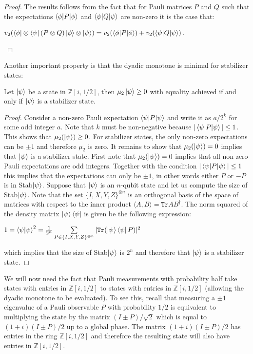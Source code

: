 \documentclass[12pt]{dalthesis}
\begin{document}
\begin{proof}
The results follows from the fact that for Pauli matrices $P$ and $Q$ such that the expectations $\braket{\phi | P |\phi}$ and $\braket{\psi | Q | \psi}$ are non-zero it is the case that:
\begin{center}
$v_2 (\bra{\phi} \otimes \bra{\psi} (P \otimes Q) \ket{\phi} \otimes \ket{\psi}) = v_2 (\braket{\phi | P | \phi}) + v_2(\braket{\psi | Q | \psi})$.
\end{center}
\end{proof}

Another important property is that the dyadic monotone is minimal for stabilizer states:
\begin{proposition}
Let $\ket{\psi}$ be a state in $\mathbb{Z}[i, 1/2]$, then $\mu_2 \ket{\psi} \geq 0$ with equality achieved if and only if $\ket{\psi}$ is a stabilizer state.
\end{proposition}
\begin{proof}
Consider a non-zero Pauli expectation $\braket{\psi |P| \psi}$ and write it as $a/2^k$ for some odd integer $a$. Note that $k$ must be non-negative because $|\braket{\psi |P| \psi}| \leq 1$. This shows that $\mu_2 (\ket{\psi}) \geq 0$. For stabilizer states, the only non-zero expectations can be $\pm 1$ and therefore $\mu_2$ is zero. It remains to show that $\mu_2 (\ket{\psi}) = 0$ implies that $\ket{\psi}$ is a stabilizer state. First note that $\mu_2 (\ket{\psi}) = 0$ implies that all non-zero Pauli expectations are odd integers. Together with the condition $|\braket{\psi |P| \psi}| \leq 1$ this implies that the expectations can only be $\pm 1$, in other words either $P$ or $-P$ is in Stab$\ket{\psi}$. Suppose that $\ket{\psi}$ is an $n$-qubit state and let us compute the size of Stab$\ket{\psi}$. Note that the set $\{ I, X, Y, Z \}^{\otimes n}$ is an orthogonal basis of the space of matrices with respect to the inner product $\langle A, B \rangle = \texttt{Tr} AB^{\dag}$. The norm squared of the density matrix $\ket{\psi} \bra{\psi}$ is given be the following expression:
\begin{center}
$1 = \braket{\psi | \psi}^2 = \frac{1}{2^n} \sum\limits_{P \in \{ I, X, Y, Z \}^{\otimes n}} |\texttt{Tr}(\ket{\psi}\bra{\psi}P)|^2$
\end{center}
which implies that the size of Stab$\ket{\psi}$ is $2^n$ and therefore that $\ket{\psi}$ is a stabilizer state.
\end{proof}

We will now need the fact that Pauli measurements with probability half take states with entries in $\mathbb{Z}[i, 1/2]$ to states with entries in $\mathbb{Z}[i, 1/2]$ (allowing the dyadic monotone to be evaluated). To see this, recall that measuring a $\pm 1$ eigenvalue of a Pauli observable $P$ with probability $1/2$ is equivalent to multiplying the state by the matrix $(I \pm P)/\sqrt{2}$ which is equal to $(1 + i)(I \pm P)/2$ up to a global phase. The matrix $(1 + i)(I \pm P)/2$ has entries in the ring $\mathbb{Z}[i, 1/2]$ and therefore the resulting state will also have entries in $\mathbb{Z}[i, 1/2]$.
\end{document}
